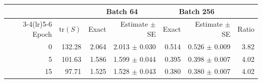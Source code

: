 \begin{tabular}{@{}rrrrrrr@{}}
\toprule
 & & \multicolumn{2}{c}{Batch 64} & \multicolumn{2}{c}{Batch 256} & \\
\cmidrule(lr){3-4}\cmidrule(lr){5-6}
Epoch & $\mathrm{tr}(S)$ & Exact & Estimate $\pm$ SE & Exact & Estimate $\pm$ SE & Ratio \\
\midrule
0 & 132.28 & 2.064 & 2.013 $\pm$ 0.030 & 0.514 & 0.526 $\pm$ 0.009 & 3.82 \\
5 & 101.63 & 1.586 & 1.599 $\pm$ 0.044 & 0.395 & 0.398 $\pm$ 0.007 & 4.02 \\
15 & 97.71 & 1.525 & 1.528 $\pm$ 0.043 & 0.380 & 0.380 $\pm$ 0.007 & 4.02 \\
\bottomrule
\end{tabular}
